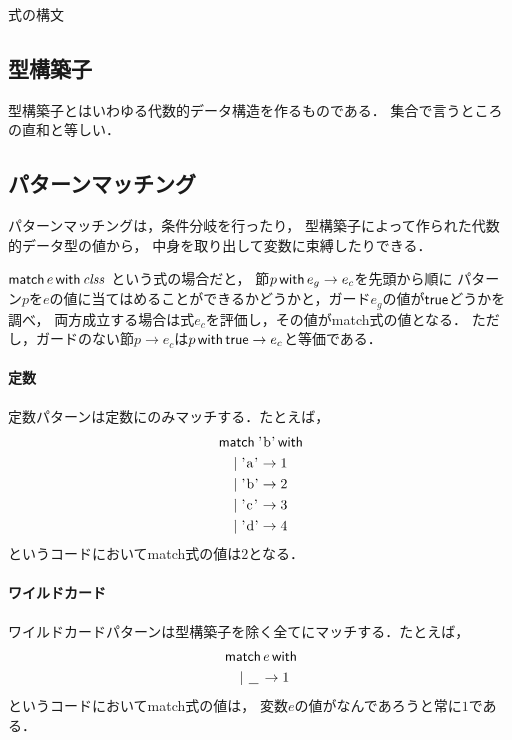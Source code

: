 \documentclass[a4paper,titlepage,report,disablejfam]{jsbook}
\begin{document}
\begin{resbonsiblesection}{式の構文}{\sakamoto}
\subsection{型構築子}\label{ssc:expr-constructor}
型構築子とはいわゆる代数的データ構造を作るものである．
集合で言うところの直和と等しい．

\subsection{パターンマッチング}\label{ssc:expr-match}
パターンマッチングは，条件分岐を行ったり，
型構築子によって作られた代数的データ型の値から，
中身を取り出して変数に束縛したりできる．

$\mathop{\mathsf{match}}e\mathop{\mathsf{with}}\mathit{clss}$
という式の場合だと，
節$p\mathop{\mathsf{with}}e_g\rightarrow e_c$を先頭から順に
パターン$p$を$e$の値に当てはめることができるかどうかと，ガード$e_g$の値が$\mathsf{true}$どうかを調べ，
両方成立する場合は式$e_c$を評価し，その値がmatch式の値となる．
ただし，ガードのない節$p\rightarrow e_c$は$p\mathop{\mathsf{with}}\mathsf{true}\rightarrow e_c$と等価である．

\paragraph{定数}
定数パターンは定数にのみマッチする．たとえば，
\begin{equation}
\begin{aligned}
&\mathnkop{match}\text{\lstinline|'b'|}\mathnkop{with} \\
&\quad \clauseor \text{\lstinline|'a'|}\rightarrow 1 \\
&\quad \clauseor \text{\lstinline|'b'|}\rightarrow 2 \\
&\quad \clauseor \text{\lstinline|'c'|}\rightarrow 3 \\
&\quad \clauseor \text{\lstinline|'d'|}\rightarrow 4
\end{aligned}
\end{equation}
というコードにおいてmatch式の値は$2$となる．

\paragraph{ワイルドカード}
ワイルドカードパターンは型構築子を除く全てにマッチする．たとえば，
\begin{equation}
\begin{aligned}
&\mathop{\mathsf{match}}e\mathop{\mathsf{with}} \\
&\quad \mathbin{|} \,\underline{\hspace{0.7em}}\, \rightarrow 1
\end{aligned}
\end{equation}
というコードにおいてmatch式の値は，
変数$e$の値がなんであろうと常に$1$である．


\end{resbonsiblesection}
\end{document}
